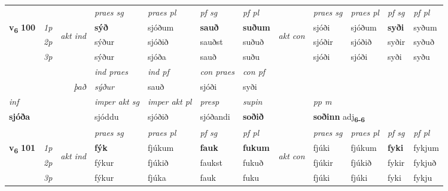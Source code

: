 \begin{longtable}[l]{X>{\footnotesize\itshape}llXXXXlXXXX}
 & &   & \textit{praes sg}  & \textit{praes pl}    & \textit{ pf sg} & \textit{pf pl} & & \textit{praes sg}  & \textit{praes pl}    & \textit{pf sg} & \textit{pf pl }  \\ \cmidrule{4-7} \cmidrule{9-12}
 \multirow{2}{*}{{{\textbf{v{\textsubscript{6}}} \Large{\textbf{100}}}}}  & 1p & \multirow{3}{*}{\begin{turn}{90}\textit{akt ind}\end{turn}} & \textbf{sýð} & sjóðum & \textbf{sauð} & \textbf{suðum} & \multirow{3}{*}{\begin{turn}{90}\textit{akt con}\end{turn}} &sjóði & sjóðum & \textbf{syði} & syðum\\*
 & 2p &  &  sýður  & sjóðið & sauðst & suðuð & & sjóðir & sjóðið & syðir & syðuð \\*
 & 3p &  & sýður & sjóða & sauð & suðu & & sjóði & sjóði& syði & syðu \\*
\cmidrule{4-7} \cmidrule{9-12}

   && &  \textit{ind praes} & \textit{ind pf} & \textit{con praes} & \textit{con pf} \\*
\multicolumn{3}{r}{\textit{það}} & sýður & sauð & sjóði & syði \\*

\cmidrule{4-7}
   {\textit{inf}} & &  & \textit{imper akt sg} & \textit{imper akt pl}   & \textit{presp} & \textit{supin}  && \textit{pp m} \\*
  {\textbf{sjóða}} & && sjóddu  & sjóðið   & sjóðandi &  \textbf{soðið}  && \multicolumn{2}{l}{\textbf{soðinn} adj\textbf{\textsubscript{6-6}}} \\*

\midrule

 & &   & \textit{praes sg}  & \textit{praes pl}    & \textit{ pf sg} & \textit{pf pl} & & \textit{praes sg}  & \textit{praes pl}    & \textit{pf sg} & \textit{pf pl }  \\ \cmidrule{4-7} \cmidrule{9-12}
 \multirow{2}{*}{{{\textbf{v{\textsubscript{6}}} \Large{\textbf{101}}}}}  & 1p & \multirow{3}{*}{\begin{turn}{90}\textit{akt ind}\end{turn}} & \textbf{fýk} & fjúkum & \textbf{fauk} & \textbf{fukum} & \multirow{3}{*}{\begin{turn}{90}\textit{akt con}\end{turn}} &fjúki & fjúkum & \textbf{fyki} & fykjum\\*
 & 2p &  &  fýkur  & fjúkið & faukst & fukuð & & fjúkir & fjúkið & fykir & fykjuð \\*
 & 3p &  & fýkur & fjúka & fauk & fuku & & fjúki & fjúki& fyki & fykju \\*
\cmidrule{4-7} \cmidrule{9-12}


\end{longtable}
